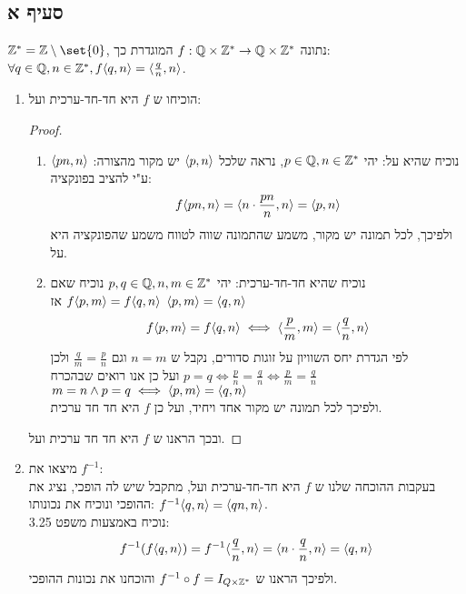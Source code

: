 \documentclass{article}
\DeclarePairedDelimiter\set\{\}
\begin{document}
\subsection*{סעיף א}
$\ZZ^* = \ZZ \sub \set{0}$,
נתונה $f: \mathbb{Q} \times \mathbb{Z}^* \to \mathbb{Q} \times \mathbb{Z}^*$ המוגדרת כך: \\
$\forall q \in \mathbb{Q}, n \in \mathbb{Z}^*, f\langle q,n \rangle = \langle \frac{q}{n}, n \rangle$.
\begin{enumerate}
	\item הוכיחו ש $f$ היא חד-חד-ערכית ועל:
	\begin{proof} \nl
		\begin{enumerate}
			\item נוכיח שהיא על:
			יהי $p \in \mathbb{Q}, n \in \mathbb{Z}^*$, נראה שלכל $\langle p, n \rangle$ יש מקור מהצורה: $\langle pn, n \rangle$ ע"י להציב בפונקציה:
			\[
				f\langle pn, n \rangle = \langle n \cdot \frac{pn}{n}, n \rangle = \langle p, n \rangle
			\]
			ולפיכך, לכל תמונה יש מקור, משמע שהתמונה שווה לטווח משמע שהפונקציה היא על.

			\item נוכיח שהיא חד-חד-ערכית:
			יהי $p,q \in \mathbb{Q}, n,m \in \mathbb{Z}^*$
			נוכיח שאם $f\langle p,m \rangle = f\langle q,n \rangle$ אז $\langle p,m \rangle = \langle q,n \rangle$
			\[
				f\langle p,m \rangle = f\langle q,n \rangle \iff
				\langle \frac{p}{m}, m \rangle = \langle \frac{q}{n}, n \rangle
			\]
			לפי הגדרת יחס השוויון על זוגות סדורים, נקבל ש $n = m$ וגם $\frac{q}{m} = \frac{p}{n}$ ולכן
			$p = q \iff \frac{p}{n} = \frac{q}{n} \iff \frac{p}{m} = \frac{q}{n}$
			ועל כן אנו רואים שבהכרח $m = n \land p = q \iff \langle p,m \rangle = \langle q,n \rangle$ \\
			ולפיכך לכל תמונה יש מקור אחד ויחיד, ועל כן $f$ היא חד חד ערכית.
		\end{enumerate}
		ובכך הראנו ש $f$ היא חד חד ערכית ועל.
	\end{proof}
	\item מיצאו את $f^{-1}$:  \\
	בעקבות ההוכחה שלנו ש $f$ היא חד-חד-ערכית ועל, מתקבל שיש לה הופכי, נציג את ההופכי ונוכיח את נכונותו:
	$f^{-1}\langle q,n \rangle = \langle qn,n \rangle$. \\
	נוכיח באמצעות משפט 3.25:
	\[
		f^{-1}(f\langle q,n \rangle) = f^{-1}\langle \frac{q}{n}, n \rangle =
		\langle n \cdot \frac{q}{n}, n \rangle = \langle q,n \rangle
	\]
	ולפיכך הראנו ש $f^{-1} \circ f = I_{Q \times \mathbb{Z}^*}$ והוכחנו את נכונות ההופכי.
\end{enumerate}
\pagebreak
\end{document}
